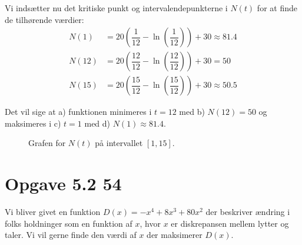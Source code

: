 \documentclass{article}
\theoremstyle{definition}
\theoremstyle{remark}
\begin{document}
Vi indsætter nu det kritiske punkt og intervalendepunkterne i $N(t)$ for at finde de tilhørende værdier:
\begin{align*}
N(1) &= 20 (\dfrac{1}{12} - \ln(\dfrac{1}{12} )) + 30 \approx 81.4 \\
N(12) &= 20 (\dfrac{12}{12} - \ln(\dfrac{12}{12} )) + 30 = 50 \\
N(15) &= 20 (\dfrac{15}{12} - \ln(\dfrac{15}{12} )) + 30 \approx 50.5
\end{align*}

Det vil sige at a) funktionen minimeres i $t = 12$ med b) $N(12) = 50$ og maksimeres i c) $t = 1$ med d) $N(1) \approx 81.4$.

\begin{figure}[H]
    \centering
    \caption{Grafen for $N(t)$ på intervallet $[1,15]$.}
\end{figure}


\newpage
\section*{Opgave 5.2 54}
Vi bliver givet en funktion $D(x) = -x^4 +8x^3 + 80x^2$ der beskriver  ændring i folks holdninger som en funktion af $x$, hvor $x$ er diskrepansen mellem lytter og taler. Vi vil gerne finde den værdi af $x$ der maksimerer $D(x)$.
\end{document}
